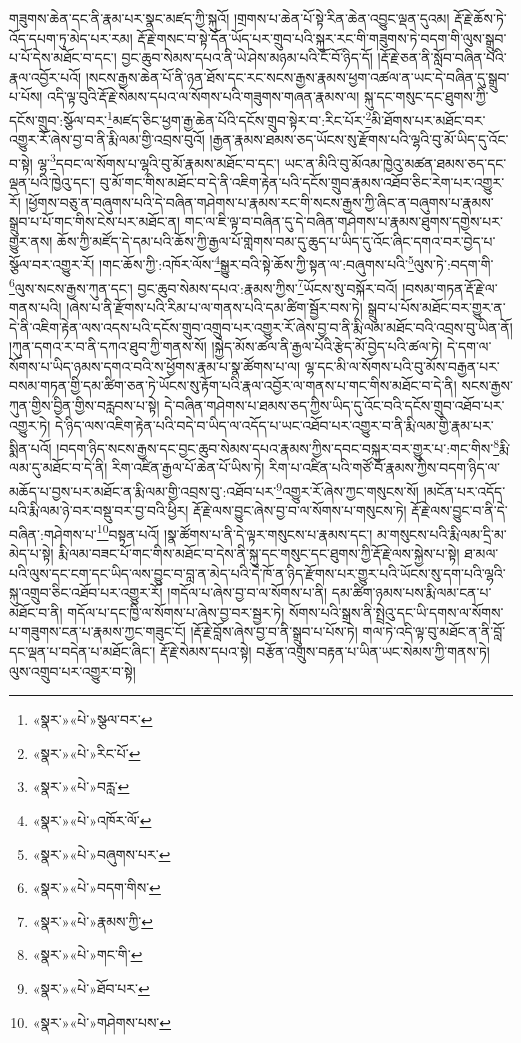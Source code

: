 གཟུགས་ཆེན་དང་ནི་རྣམ་པར་སྣང་མཛད་ཀྱི་སྐུའོ། །གྲགས་པ་ཆེན་པོ་སྟེ་རིན་ཆེན་འབྱུང་ལྡན་དུའམ། རྡོ་རྗེ་ཆོས་ཏེ་འོད་དཔག་ཏུ་མེད་པར་རམ། རྡོ་རྗེ་གསང་བ་སྟེ་དོན་ཡོད་པར་གྲུབ་པའི་སྐུར་རང་གི་གཟུགས་ཏེ་བདག་གི་ལུས་སྒྲུབ་པ་པོ་དེས་མཐོང་བ་དང་། བྱང་ཆུབ་སེམས་དཔའ་ནི་ཡེ་ཤེས་མཉམ་པའི་ངོ་བོ་ཉིད་དོ། །རྡོ་རྗེ་ཅན་ནི་སློབ་བཞིན་པའི་རྣལ་འབྱོར་པའོ། །སངས་རྒྱས་ཆེན་པོ་ནི་ཉན་ཐོས་དང་རང་སངས་རྒྱས་རྣམས་ཕྱག་འཚལ་ན་ཡང་དེ་བཞིན་དུ་སྒྲུབ་པ་པོས། འདི་ལྟ་བུའི་རྡོ་རྗེ་སེམས་དཔའ་ལ་སོགས་པའི་གཟུགས་གཞན་རྣམས་ལ། སྐུ་དང་གསུང་དང་ཐུགས་ཀྱི་དངོས་གྲུབ་:སྩོལ་བར་\footnote{«སྣར་»«པེ་»སྩལ་བར་}མཛད་ཅིང་ཕྱག་རྒྱ་ཆེན་པོའི་དངོས་གྲུབ་སྟེར་བ་:རིང་པོར་\footnote{«སྣར་»«པེ་»རིང་པོ་}མི་ཐོགས་པར་མཐོང་བར་འགྱུར་རོ་ཞེས་བྱ་བ་ནི་རྨི་ལམ་གྱི་འབྲས་བུའོ། །རྒྱན་རྣམས་ཐམས་ཅད་ཡོངས་སུ་རྫོགས་པའི་ལྷའི་བུ་མོ་ཡིད་དུ་འོང་བ་སྟེ། ལྷ་\footnote{«སྣར་»«པེ་»བརླ་}དབང་ལ་སོགས་པ་ལྷའི་བུ་མོ་རྣམས་མཐོང་བ་དང་། ཡང་ན་མིའི་བུ་མོའམ་ཁྱེའུ་མཚན་ཐམས་ཅད་དང་ལྡན་པའི་ཁྱེའུ་དང་། བུ་མོ་གང་གིས་མཐོང་བ་དེ་ནི་འཇིག་རྟེན་པའི་དངོས་གྲུབ་རྣམས་འཐོབ་ཅིང་རེག་པར་འགྱུར་རོ། །ཕྱོགས་བཅུ་ན་བཞུགས་པའི་དེ་བཞིན་གཤེགས་པ་རྣམས་རང་གི་སངས་རྒྱས་ཀྱི་ཞིང་ན་བཞུགས་པ་རྣམས་སྒྲུབ་པ་པོ་གང་གིས་ངེས་པར་མཐོང་ན། གང་ལ་ཇི་ལྟ་བ་བཞིན་དུ་དེ་བཞིན་གཤེགས་པ་རྣམས་ཐུགས་དགྱེས་པར་གྱུར་ནས། ཆོས་ཀྱི་མཛོད་དེ་དམ་པའི་ཆོས་ཀྱི་རྒྱལ་པོ་གླེགས་བམ་དུ་ཆུད་པ་ཡིད་དུ་འོང་ཞིང་དགའ་བར་བྱེད་པ་སྩོལ་བར་འགྱུར་རོ། །གང་ཆོས་ཀྱི་:འཁོར་ལོས་\footnote{«སྣར་»«པེ་»འཁོར་ལོ་}སྒྱུར་བའི་སྟེ་ཆོས་ཀྱི་སྟན་ལ་:བཞུགས་པའི་\footnote{«སྣར་»«པེ་»བཞུགས་པར་}ལུས་ཏེ་:བདག་གི་\footnote{«སྣར་»«པེ་»བདག་གིས་}ལུས་སངས་རྒྱས་ཀུན་དང་། བྱང་ཆུབ་སེམས་དཔའ་:རྣམས་ཀྱིས་\footnote{«སྣར་»«པེ་»རྣམས་ཀྱི་}ཡོངས་སུ་བསྐོར་བའོ། །བསམ་གཏན་རྡོ་རྗེ་ལ་གནས་པའི། །ཞེས་པ་ནི་རྫོགས་པའི་རིམ་པ་ལ་གནས་པའི་དམ་ཚིག་སྦྱོར་བས་ཏེ། སྒྲུབ་པ་པོས་མཐོང་བར་གྱུར་ན་དེ་ནི་འཇིག་རྟེན་ལས་འདས་པའི་དངོས་གྲུབ་འགྲུབ་པར་འགྱུར་རོ་ཞེས་བྱ་བ་ནི་རྨི་ལམ་མཐོང་བའི་འབྲས་བུ་ཡིན་ནོ། །ཀུན་དགའ་ར་བ་ནི་དཀའ་ཐུབ་ཀྱི་གནས་སོ། །སྐྱེད་མོས་ཚལ་ནི་རྒྱལ་པོའི་རྩེད་མོ་བྱེད་པའི་ཚལ་ཏེ། དེ་དག་ལ་སོགས་པ་ཡིད་ཉམས་དགའ་བའི་ས་ཕྱོགས་རྣམ་པ་སྣ་ཚོགས་པ་ལ། ལྷ་དང་མི་ལ་སོགས་པའི་བུ་མོས་བརྒྱན་པར་བསམ་གཏན་གྱི་དམ་ཚིག་ཅན་ཏེ་ཡོངས་སུ་རྟོག་པའི་རྣལ་འབྱོར་ལ་གནས་པ་གང་གིས་མཐོང་བ་དེ་ནི། སངས་རྒྱས་ཀུན་གྱིས་བྱིན་གྱིས་བརླབས་པ་སྟེ། དེ་བཞིན་གཤེགས་པ་ཐམས་ཅད་ཀྱིས་ཡིད་དུ་འོང་བའི་དངོས་གྲུབ་འཐོབ་པར་འགྱུར་ཏེ། དེ་ཉིད་ལས་འཇིག་རྟེན་པའི་བདེ་བ་ཡིད་ལ་འདོད་པ་ཡང་འཐོབ་པར་འགྱུར་བ་ནི་རྨི་ལམ་གྱི་རྣམ་པར་སྨིན་པའོ། །བདག་ཉིད་སངས་རྒྱས་དང་བྱང་ཆུབ་སེམས་དཔའ་རྣམས་ཀྱིས་དབང་བསྐུར་བར་གྱུར་པ་:གང་གིས་\footnote{«སྣར་»«པེ་»གང་གི་}རྨི་ལམ་དུ་མཐོང་བ་དེ་ནི། རིག་འཛིན་རྒྱལ་པོ་ཆེན་པོ་ཡིས་ཏེ། རིག་པ་འཛིན་པའི་གཙོ་བོ་རྣམས་ཀྱིས་བདག་ཉིད་ལ་མཆོད་པ་བྱས་པར་མཐོང་ན་རྨི་ལམ་གྱི་འབྲས་བུ་:འཐོབ་པར་\footnote{«སྣར་»«པེ་»ཐོབ་པར་}འགྱུར་རོ་ཞེས་ཀྱང་གསུངས་སོ། །མངོན་པར་འདོད་པའི་རྨི་ལམ་ཉེ་བར་བསྡུ་བར་བྱ་བའི་ཕྱིར། རྡོ་རྗེ་ལས་བྱུང་ཞེས་བྱ་བ་ལ་སོགས་པ་གསུངས་ཏེ། རྡོ་རྗེ་ལས་བྱུང་བ་ནི་དེ་བཞིན་:གཤེགས་པ་\footnote{«སྣར་»«པེ་»གཤེགས་པས་}བསྟན་པའོ། །སྣ་ཚོགས་པ་ནི་དེ་ལྟར་གསུངས་པ་རྣམས་དང་། མ་གསུངས་པའི་རྨི་ལམ་དྲི་མ་མེད་པ་སྟེ། རྨི་ལམ་བཟང་པོ་གང་གིས་མཐོང་བ་དེས་ནི་སྐུ་དང་གསུང་དང་ཐུགས་ཀྱི་རྡོ་རྗེ་ལས་སྐྱེས་པ་སྟེ། ཐ་མལ་པའི་ལུས་དང་ངག་དང་ཡིད་ལས་བྱུང་བ་བླ་ན་མེད་པའི་དེ་ཁོ་ན་ཉིད་རྫོགས་པར་གྱུར་པའི་ཡོངས་སུ་དག་པའི་ལྷའི་སྐུ་འགྲུབ་ཅིང་འཐོབ་པར་འགྱུར་རོ། །གདོལ་པ་ཞེས་བྱ་བ་ལ་སོགས་པ་ནི། དམ་ཚིག་ཉམས་པས་རྨི་ལམ་ངན་པ་མཐོང་བ་ནི། གདོལ་པ་དང་ཁྱི་ལ་སོགས་པ་ཞེས་བྱ་བར་སྦྱར་ཏེ། སོགས་པའི་སྒྲས་ནི་སྤྲེའུ་དང་ཡི་དགས་ལ་སོགས་པ་གཟུགས་ངན་པ་རྣམས་ཀྱང་གཟུང་ངོ། །རྡོ་རྗེ་བློས་ཞེས་བྱ་བ་ནི་སྒྲུབ་པ་པོས་ཏེ། གལ་ཏེ་འདི་ལྟ་བུ་མཐོང་ན་ནི་བློ་དང་ལྡན་པ་བདེན་པ་མཐོང་ཞིང་། རྡོ་རྗེ་སེམས་དཔའ་སྟེ། བརྩོན་འགྲུས་བརྟན་པ་ཡིན་ཡང་སེམས་ཀྱི་གནས་ཏེ། ལུས་འགྲུབ་པར་འགྱུར་བ་སྟེ། 